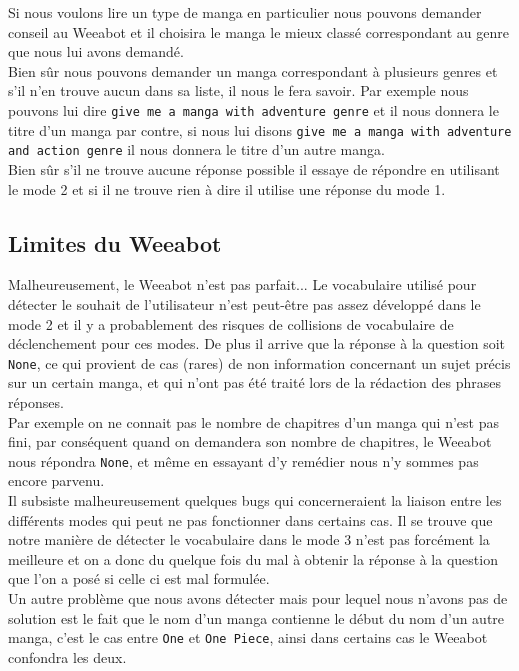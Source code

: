 \documentclass[paper=a4, fontsize=11pt]{article}
\begin{document}
\begin{itemize}
Si nous voulons lire un type de manga en particulier nous pouvons demander conseil au Weeabot et il choisira le manga le mieux classé correspondant au genre que nous lui avons demandé. \\
Bien sûr nous pouvons demander un manga correspondant à plusieurs genres et s'il n'en trouve aucun dans sa liste, il nous le fera savoir. Par exemple nous pouvons lui dire \texttt{give me a manga with adventure genre} et il nous donnera le titre d'un manga par contre, si nous lui disons \texttt{give me a manga with adventure and action genre} il nous donnera le titre d'un autre manga.\\
Bien sûr s'il ne trouve aucune réponse possible il essaye de répondre en utilisant le mode 2 et si il ne trouve rien à dire il utilise une réponse du mode 1.\\
\end{itemize}

\subsection{Limites du Weeabot}
Malheureusement, le Weeabot n'est pas parfait...
Le vocabulaire utilisé pour détecter le souhait de l’utilisateur n’est peut-être pas assez développé dans le mode 2 et il y a probablement des risques de collisions de vocabulaire de déclenchement pour ces modes. De plus il arrive que la réponse à la question soit \texttt{None}, ce qui provient de cas (rares) de non information concernant un sujet précis sur un certain manga, et qui n’ont pas été traité lors de la rédaction des phrases réponses.\\
Par exemple on ne connait pas le nombre de chapitres d'un manga qui n'est pas fini, par conséquent quand on demandera son nombre de chapitres, le Weeabot nous répondra \texttt{None}, et même en essayant d'y remédier nous n'y sommes pas encore parvenu. \\

Il subsiste malheureusement quelques bugs qui concerneraient la liaison entre les différents modes qui peut ne pas fonctionner dans certains cas. Il se trouve que notre manière de détecter le vocabulaire dans le mode 3 n'est pas forcément la meilleure et on a donc du quelque fois du mal à obtenir la réponse à la question que l'on a posé si celle ci est mal formulée.\\ 
Un autre problème que nous avons détecter mais pour lequel nous n'avons pas de solution est le fait que le nom d'un manga contienne le début du nom d'un autre manga, c'est le cas entre \texttt{One} et \texttt{One Piece}, ainsi dans certains cas le Weeabot confondra les deux.\\
\end{document}
